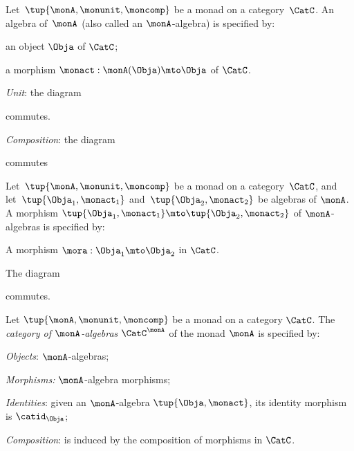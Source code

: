 \begin{ctdefinition}
    \label{def:algebramon}
Let~$\tup{\monA, \monunit, \moncomp}$ be a monad on a category~$\CatC$. An algebra of~$\monA$ (also called an $\monA$-algebra) is specified by: \
\constit
\begin{compactenum}
\item an object $\Obja$ of $\CatC$;
\item a morphism $\monact: \monA(\Obja) \mto \Obja$ of $\CatC$.
\end{compactenum}
\condit
\begin{compactenum}
\item \emph{Unit}: the diagram 
\begin{center}
  \end{center}
commutes.
\item \emph{Composition}: the diagram
\begin{center}
  \end{center}
commutes
\end{compactenum}
\end{ctdefinition}


\begin{ctdefinition}
    \label{def:algebramorphism}
Let~$\tup{\monA, \monunit, \moncomp}$ be a monad on a category~$\CatC$, and let~$\tup{\Obja_1, \monact_1}$ and~$\tup{\Obja_2, \monact_2}$ be algebras of $\monA$. A morphism $\tup{\Obja_1, \monact_1} \mto \tup{\Obja_2, \monact_2}$ of $\monA$-algebras is specified by:

\constit
\begin{compactenum}
\item A morphism $\mora : \Obja_1 \mto \Obja_2$ in $\CatC$.
\end{compactenum}
\condit
\begin{compactenum}
\item The diagram
\begin{center}
  \end{center}
commutes. 
\end{compactenum}
\end{ctdefinition}


\begin{ctdefinition}
    \label{def:catofmonadalgebras}
Let $\tup{\monA, \monunit, \moncomp}$ be a monad on a category $\CatC$. The \emph{category of $\monA$-algebras} $\CatC^\monA$ of the monad $\monA$ is specified by:
\begin{compactenum}
\item \emph{Objects}: $\monA$-algebras;
\item \emph{Morphisms:} $\monA$-algebra morphisms;
\item \emph{Identities}: given an $\monA$-algebra $\tup{\Obja, \monact}$, its identity morphism is $\catid_\Obja$;
\item \emph{Composition}: is induced by the composition of morphisms in $\CatC$.
\end{compactenum}
\end{ctdefinition}


